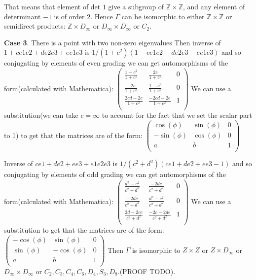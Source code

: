 \documentclass[a4paper]{article}
\begin{document}
That means that element of det $1$ give a subgroup of $\mathbb{Z} \times \mathbb{Z}$, and any element of determinant $-1$ is of order 2.
Hence $\Gamma$ can be isomorphic to either $\mathbb{Z} \times \mathbb{Z}$ or semidirect products: $\mathbb{Z} \times D_\infty$ or $D_\infty \times D_\infty$ or $C_2$.

\textbf{Case 3}. There is a point with two non-zero eigenvalues
Then inverse of $1+c e1e2+d e2e3+ e e1e3$ is $1/(1+c^2)(1-c e1e2-d e2e3- e e1e3)$ and so conjugating by elements of even grading we can get automorphisms of the form(calculated with Mathematica):
$\begin{pmatrix}
\frac{1-c^2}{1+c^2} & \frac{2c}{1+c^2} &0 \\ 
\frac{-2c}{1+c^2} & \frac{1-c^2}{1+c^2} & 0\\
\frac{2cd-2e}{1+c^2} & \frac{-2cd-2e}{1+c^2} &  1\\
\end{pmatrix}$
We can use a substitution(we can take $c=\infty$ to account for the fact that we set the scalar part to $1$) to get that the matrices are of the form:
$\begin{pmatrix}
\cos(\phi) & \sin(\phi) &0 \\ 
-\sin(\phi) & \cos(\phi) & 0\\
a & b &  1\\
\end{pmatrix}$

Inverse of $c e1+d e2+ e e3+ e1e2e3$ is $1/(c^2+d^2) (c e1 + d e2 + e e3 -1)$ and so conjugating by elements of odd grading we can get automorphisms of the form(calculated with Mathematica):
$\begin{pmatrix}
\frac{d^2-c^2}{c^2+d^2} & \frac{-2 d c}{c^2+d^2} &0 \\ 
\frac{-2 d c}{c^2+d^2} & \frac{d^2-c^2}{c^2+d^2} & 0\\
\frac{2d-2ce}{c^2+d^2} & \frac{-2c-2de}{c^2+d^2} &  1\\
\end{pmatrix}$
We can use a substitution to get that the matrices are of the form:
$\begin{pmatrix}
-\cos(\phi) & \sin(\phi) &0 \\ 
\sin(\phi) & -\cos(\phi) & 0\\
a & b &  1\\
\end{pmatrix}$
Then $\Gamma$ is isomorphic to $Z \times Z$ or $Z \times D_\infty$ or $D_\infty \times D_\infty$ or $C_2, C_3, C_4, C_6, D_4, S_3,D_8$.(PROOF TODO).
\end{document}
